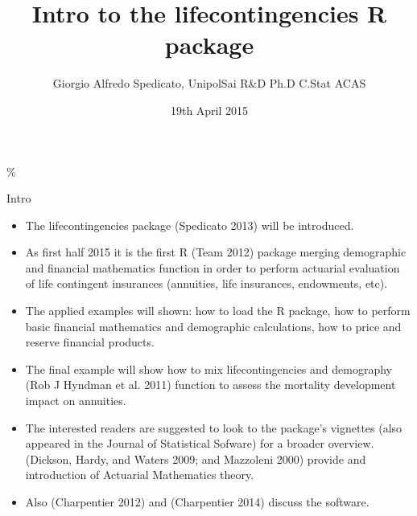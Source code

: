 \documentclass[ignorenonframetext,]{beamer}
\title{Intro to the lifecontingencies R package}
\author{Giorgio Alfredo Spedicato, UnipolSai R\&D Ph.D C.Stat ACAS}
\date{19th April 2015}
\begin{document}
\frame{\titlepage}

\begin{frame}
\tableofcontents[hideallsubsections]
\end{frame}

\begin{frame}

\%

\end{frame}

\begin{frame}{Intro}

\begin{itemize}[<+->]
\itemsep1pt\parskip0pt
\item
  The lifecontingencies package (Spedicato 2013) will be introduced.
\item
  As first half 2015 it is the first R (Team 2012) package merging
  demographic and financial mathematics function in order to perform
  actuarial evaluation of life contingent insurances (annuities, life
  insurances, endowments, etc).
\item
  The applied examples will shown: how to load the R package, how to
  perform basic financial mathematics and demographic calculations, how
  to price and reserve financial products.
\end{itemize}

\end{frame}

\begin{frame}

\begin{itemize}[<+->]
\itemsep1pt\parskip0pt
\item
  The final example will show how to mix lifecontingencies and
  demography (Rob J Hyndman et al. 2011) function to assess the
  mortality development impact on annuities.
\item
  The interested readers are suggested to look to the package's
  vignettes (also appeared in the Journal of Statistical Sofware) for a
  broader overview. (Dickson, Hardy, and Waters 2009; and Mazzoleni
  2000) provide and introduction of Actuarial Mathematics theory.
\item
  Also (Charpentier 2012) and (Charpentier 2014) discuss the software.
\end{itemize}

\end{frame}
\end{document}

